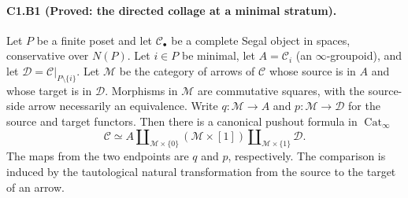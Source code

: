 
\paragraph{C1.B1 (Proved: the directed collage at a minimal stratum).}
Let $P$ be a finite poset and let $\mathcal C_\bullet$ be a complete
Segal object in spaces, conservative over $N(P)$. Let $i\in P$ be
minimal, let $A=\mathcal C_i$ (an $\infty$-groupoid), and let
$\mathcal D=\mathcal C|_{P\setminus\{i\}}$. Let $\mathcal M$ be the
category of arrows of $\mathcal C$ whose source is in $A$ and whose
target is in $\mathcal D$. Morphisms in $\mathcal M$ are commutative
squares, with the source-side arrow necessarily an equivalence.
Write $q:\mathcal M\to A$ and $p:\mathcal M\to\mathcal D$ for the
source and target functors. Then there is a canonical pushout formula
in $\operatorname{Cat}_\infty$
\[
 \mathcal C\simeq
 A\mathbin{\coprod}_{\mathcal M\times\{0\}}
 (\mathcal M\times[1])
 \mathbin{\coprod}_{\mathcal M\times\{1\}}\mathcal D.
 \tag{C1.B1}
\]
The maps from the two endpoints are $q$ and $p$, respectively.
The comparison is induced by the tautological natural transformation
from the source to the target of an arrow.

